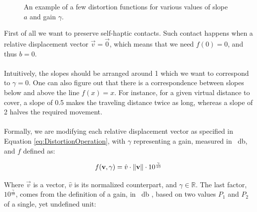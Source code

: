 \begin{figure}[h]
    \caption{An example of a few distortion functions for various values of slope $a$ and gain $\gamma $.}\label{fig:plotsOfGamma}
\end{figure}

\noindent
First of all we want to preserve self-haptic contacts. Such contact happens when a relative displacement vector $\vec{v} = \vec{0}$, which means that we need $f(0) = 0$, and thus $b = 0$.
\\\\
Intuitively, the slopes should be arranged around 1 which we want to correspond to $\gamma = 0$. One can also figure out that there is a correspondence between slopes below and above the line $f(x) = x$. For instance, for a given virtual distance to cover, a slope of \num{0.5} makes the traveling distance twice as long, whereas a slope of \num{2} halves the required movement.
\\\\
Formally, we are modifying each relative displacement vector as specified in Equation \ref{eq:DistortionOperation}, with $\gamma$ representing a gain, measured in \SI{}{\decibel}, and $f$ defined as:

\begin{equation}
\label{eq:DistortionFunction}
f(\mathbf{v},\gamma ) = \hat{v} \cdot \lVert\mathbf{v}\rVert \cdot 10^{\frac{\gamma}{10}}
\end{equation}

\noindent
Where $\vec{v}$ is a vector, $\hat{v}$ is its normalized counterpart, and $\gamma \in \mathbb{R}$. The last factor, $10^{\frac{\gamma}{10}}$, comes from the definition of a gain, in \SI{}{\decibel} \cite{book:decibel}, based on two values $P_1$ and $P_2$ of a single, yet undefined unit:

